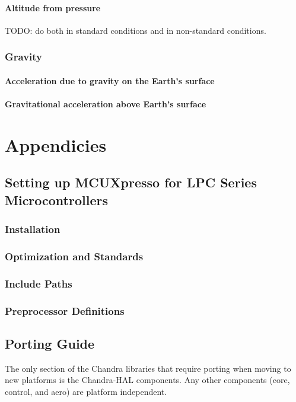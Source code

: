\documentclass[10pt,letterpaper]{memoir} %
\begin{document}
\subsection{Altitude from pressure}
TODO: do both in standard conditions and in non-standard conditions.

\section{Gravity}
\subsection{Acceleration due to gravity on the Earth's surface}
\subsection{Gravitational acceleration above Earth's surface}

\appendix
\part{Appendicies}

\chapter{Setting up MCUXpresso for LPC Series Microcontrollers}
\section{Installation}
\section{Optimization and Standards}
\section{Include Paths}
\section{Preprocessor Definitions}

\chapter{Porting Guide}
The only section of the Chandra libraries that require porting when moving to new platforms is the Chandra-HAL components.  Any other components (core, control, and aero) are platform independent.
\end{document}
